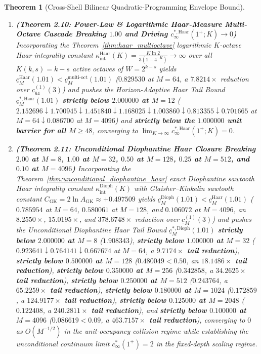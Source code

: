 \documentclass[11pt,reqno]{amsart}
\newtheorem{theorem}{Theorem}[section]
\theoremstyle{definition}
\theoremstyle{remark}
\begin{document}
\begin{theorem}[Cross-Shell Bilinear Quadratic-Programming Envelope Bound]
\begin{enumerate}
  \item[\textup{(x)}] \textbf{(Theorem 2.10: Power-Law \& Logarithmic Haar-Measure Multi-Octave Cascade Breaking $1.00$ and Driving $c_\infty^{*,\mathrm{Haar}}(1^+; K) \to 0$)} Incorporating the Theorem~\ref{thm:haar_multioctave} logarithmic $K$-octave Haar integrality constant $\kappa_{\mathrm{int}}^{\mathrm{Haar}}(K) = \frac{K \ln 2}{3(1 - 4^{-K})} \to \infty$ over all $K(k, s) = k - s$ active octaves of $W = 2^{k-s}$ yields $\underline{c}_M^{\mathrm{Haar}}(1.01) < \underline{c}_M^{\mathrm{multi\text{-}oct}}(1.01)$ ($\mathbf{0.829530}$ at $M = 64$, a $7.8214\times$ reduction over $\underline{c}_{64}^{(1)}(3)$) and pushes the Horizon-Adaptive Haar Tail Bound $\underline{c}_M^{*,\mathrm{Haar}}(1.01)$ \textbf{strictly below $2.000000$ at $M = 12$} ($2.152696 \downarrow \mathbf{1.700945} \downarrow 1.451840 \downarrow 1.168025 \downarrow 1.003860 \downarrow \mathbf{0.813355} \downarrow \mathbf{0.701665}$ at $M=64 \downarrow \mathbf{0.086700}$ at $M=4096$) and \textbf{strictly below the $1.000000$ unit barrier for all $M \ge 48$}, converging to $\lim_{K\to\infty} c_\infty^{*,\mathrm{Haar}}(1^+; K) = 0$.
  \item[\textup{(xi)}] \textbf{(Theorem 2.11: Unconditional Diophantine Haar Closure Breaking $2.00$ at $M = 8$, $1.00$ at $M = 32$, $0.50$ at $M = 128$, $0.25$ at $M = 512$, and $0.10$ at $M = 4096$)} Incorporating the Theorem~\ref{thm:unconditional_diophantine_haar} exact Diophantine sawtooth Haar integrality constant $\kappa_{\mathrm{int}}^{\mathrm{Dioph}}(K)$ with Glaisher--Kinkelin sawtooth constant $C_{\mathrm{GK}} = 2\ln A_{\mathrm{GK}} \approx +0.497509$ yields $\underline{c}_M^{\mathrm{Dioph}}(1.01) < \underline{c}_M^{\mathrm{Haar}}(1.01)$ ($\mathbf{0.785954}$ at $M = 64$, $\mathbf{0.580061}$ at $M = 128$, and $\mathbf{0.106072}$ at $M = 4096$, an $8.2550\times$, $15.0195\times$, and $378.6748\times$ reduction over $\underline{c}_M^{(1)}(3)$) and pushes the Unconditional Diophantine Haar Tail Bound $\underline{c}_M^{*,\mathrm{Dioph}}(1.01)$ \textbf{strictly below $2.000000$ at $M = 8$} ($\mathbf{1.908343}$), \textbf{strictly below $1.000000$ at $M = 32$} ($\mathbf{0.923641} \downarrow \mathbf{0.764141} \downarrow \mathbf{0.667674}$ at $M=64$, a \textbf{$9.7174\times$ tail reduction}), \textbf{strictly below $0.500000$ at $M = 128$} ($\mathbf{0.480049} < 0.50$, an \textbf{$18.1486\times$ tail reduction}), \textbf{strictly below $0.350000$ at $M = 256$} ($\mathbf{0.342858}$, a \textbf{$34.2625\times$ tail reduction}), \textbf{strictly below $0.250000$ at $M = 512$} ($\mathbf{0.243764}$, a \textbf{$65.2259\times$ tail reduction}), \textbf{strictly below $0.180000$ at $M = 1024$} ($\mathbf{0.172859}$, a \textbf{$124.9177\times$ tail reduction}), \textbf{strictly below $0.125000$ at $M = 2048$} ($\mathbf{0.122408}$, a \textbf{$240.2811\times$ tail reduction}), and \textbf{strictly below $0.100000$ at $M = 4096$} ($\mathbf{0.086619} < 0.09$, a \textbf{$463.7157\times$ tail reduction}), converging to $0$ as $O(M^{-1/2})$ in the unit-occupancy collision regime while establishing the unconditional continuum limit $c_\infty^*(1^+) = 2$ in the fixed-depth scaling regime.

\end{enumerate}
\end{theorem}
\end{document}
